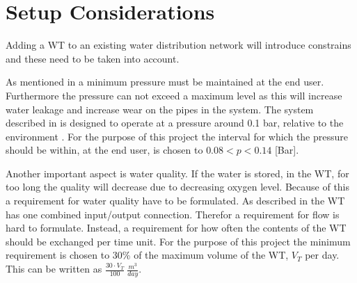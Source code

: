 

\section{Setup Considerations}



Adding a WT to an existing water distribution network will introduce constrains and these need to be taken into account. 

As mentioned in  a minimum pressure must be maintained at the end user. Furthermore the pressure can not exceed a maximum level as this will increase water leakage and increase wear on the pipes in the system. The system described in  is designed to operate at a pressure around 0.1 bar, relative to the environment \cite{master_aau}. For the purpose of this project the interval for which the pressure should be within, at the end user, is chosen to $0.08 < p < 0.14$ [Bar].

Another important aspect is water quality. If the water is stored, in the WT, for too long the quality will decrease due to decreasing oxygen level. Because of this a requirement for water quality have to be formulated. As described in  the WT has one combined input/output connection. Therefor a requirement for flow is hard to formulate. Instead, a requirement for how often the contents of the WT should be exchanged per time unit. For the purpose of this project the minimum requirement is chosen to 30\% of the maximum volume of the WT, $V_T$ per day. This can be written as $\frac{30\cdot V_T}{100} \: \frac{m^3}{day}$.










 
 